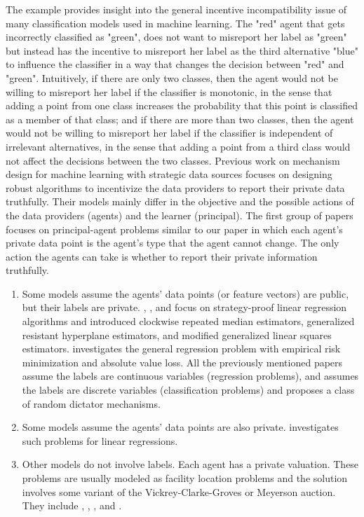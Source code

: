 \documentclass{article}
\begin{document}
The example provides insight into the general incentive incompatibility issue of many classification models used in machine learning. The "red" agent that gets incorrectly classified as "green", does not want to misreport her label as "green" but instead has the incentive to misreport her label as the third alternative "blue" to influence the classifier in a way that changes the decision between "red" and "green". Intuitively, if there are only two classes, then the agent would not be willing to misreport her label if the classifier is monotonic, in the sense that adding a point from one class increases the probability that this point is classified as a member of that class; and if there are more than two classes, then the agent would not be willing to misreport her label if the classifier is independent of irrelevant alternatives, in the sense that adding a point from a third class would not affect the decisions between the two classes.
\newline \newline
Previous work on mechanism design for machine learning with strategic data sources focuses on designing robust algorithms to incentivize the data providers to report their private data truthfully. Their models mainly differ in the objective and the possible actions of the data providers (agents) and the learner (principal).
\newline \newline
The first group of papers focuses on principal-agent problems similar to our paper in which each agent's private data point is the agent's type that the agent cannot change. The only action the agents can take is whether to report their private information truthfully.
\begin{enumerate}
\item Some models assume the agents' data points (or feature vectors) are public, but their labels are private. \citet*{perote2004strategy}, \citet*{chen2018strategyproof}, and \citet*{gast2013linear} focus on strategy-proof linear regression algorithms and introduced clockwise repeated median estimators, generalized resistant hyperplane estimators, and modified generalized linear squares estimators. \citet*{dekel2010incentive} investigates the general regression problem with empirical risk minimization and absolute value loss. All the previously mentioned papers assume the labels are continuous variables (regression problems), and \citet*{meir2012algorithms} assumes the labels are discrete variables (classification problems) and proposes a class of random dictator mechanisms.
\item Some models assume the agents' data points are also private. \citet*{chen2019grinding} investigates such problems for linear regressions.
\item Other models do not involve labels. Each agent has a private valuation. These problems are usually modeled as facility location problems and the solution involves some variant of the Vickrey-Clarke-Groves or Meyerson auction. They include \citet*{dutting2017optimal}, \citet*{golowich2018deep}, \citet*{epasto2018incentive}, and \citet*{procaccia2009approximate}.
\end{enumerate}
\end{document}
